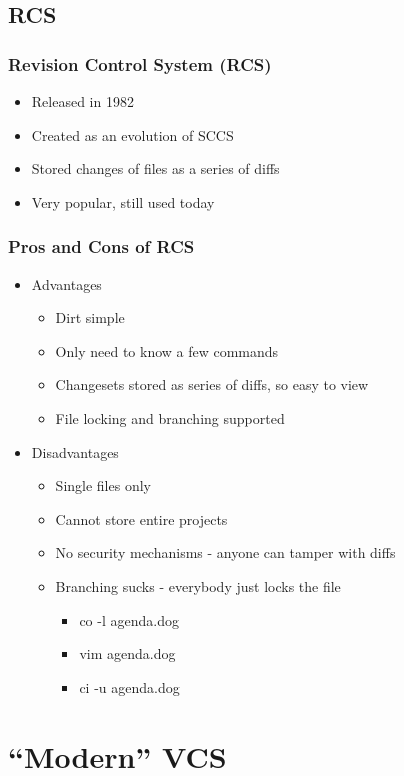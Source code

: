 \documentclass{beamer}
\begin{document}
\subsection{RCS}

\begin{frame}
    \frametitle{Revision Control System (RCS)}
    \begin{itemize}
	\item Released in 1982
	\item Created as an evolution of SCCS
	\item Stored changes of files as a series of diffs
	\item Very popular, still used today
    \end{itemize}
\end{frame}

\begin{frame}
    \frametitle{Pros and Cons of RCS}
    \begin{itemize}
	\item Advantages
	\begin{itemize}
	    \item Dirt simple
	    \item Only need to know a few commands
	    \item Changesets stored as series of diffs, so easy to view
	    \item File locking and branching supported
	\end{itemize}
	\item Disadvantages
	\begin{itemize}
	    \item Single files only
	    \item Cannot store entire projects
	    \item No security mechanisms - anyone can tamper with diffs
	    \item Branching sucks - everybody just locks the file
	    \begin{itemize}
		\item co -l agenda.dog
		\item vim agenda.dog
		\item ci -u agenda.dog
	    \end{itemize}
	\end{itemize}
    \end{itemize}
\end{frame}

\section{``Modern'' VCS}
\end{document}

